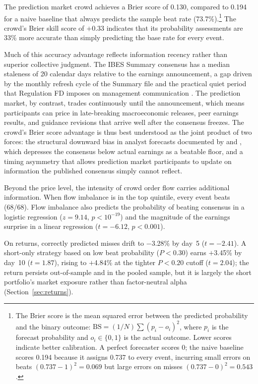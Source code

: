 \documentclass[11pt]{article}
\begin{document}
The prediction market crowd achieves a Brier score of 0.130, compared to 0.194 for a naive baseline that always predicts the sample beat rate (73.7\%).\footnote{The Brier score \citep{brier1950verification} is the mean squared error between the predicted probability and the binary outcome: $\text{BS} = (1/N) \sum (p_i - o_i)^2$, where $p_i$ is the forecast probability and $o_i \in \{0, 1\}$ is the actual outcome. Lower scores indicate better calibration. A perfect forecaster scores 0; the naive baseline scores 0.194 because it assigns 0.737 to every event, incurring small errors on beats $(0.737 - 1)^2 = 0.069$ but large errors on misses $(0.737 - 0)^2 = 0.543$.} The crowd's Brier skill score of $+$0.33 indicates that its probability assessments are 33\% more accurate than simply predicting the base rate for every event.

Much of this accuracy advantage reflects information recency rather than superior collective judgment. The IBES Summary consensus has a median staleness of 20 calendar days relative to the earnings announcement, a gap driven by the monthly refresh cycle of the Summary file and the practical quiet period that Regulation FD imposes on management communication \citep{heflin2003regulation}. The prediction market, by contrast, trades continuously until the announcement, which means participants can price in late-breaking macroeconomic releases, peer earnings results, and guidance revisions that arrive well after the consensus freezes. The crowd's Brier score advantage is thus best understood as the joint product of two forces: the structural downward bias in analyst forecasts documented by \citet{richardson2004walk} and \citet{matsumoto2002management}, which depresses the consensus below actual earnings as a beatable floor, and a timing asymmetry that allows prediction market participants to update on information the published consensus simply cannot reflect.

Beyond the price level, the intensity of crowd order flow carries additional information. When flow imbalance is in the top quintile, every event beats (68/68). Flow imbalance also predicts the probability of beating consensus in a logistic regression ($z = 9.14$, $p < 10^{-19}$) and the magnitude of the earnings surprise in a linear regression ($t = -6.12$, $p < 0.001$).

On returns, correctly predicted misses drift to $-$3.28\% by day~5 ($t = -2.41$). A short-only strategy based on low beat probability ($P < 0.30$) earns $+$3.45\% by day~10 ($t = 1.87$), rising to $+$4.84\% at the tighter $P < 0.20$ cutoff ($t = 2.04$); the return persists out-of-sample and in the pooled sample, but it is largely the short portfolio's market exposure rather than factor-neutral alpha (Section~\ref{sec:returns}).
\end{document}
